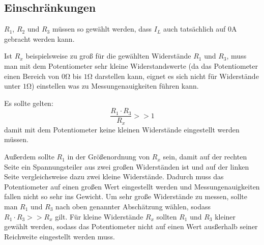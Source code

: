 \documentclass[10pt]{report}
\begin{document}
        \subsection{Einschränkungen}
        $R_1$, $R_2$ und $R_3$ müssen so gewählt werden, dass $I_L$ auch tatsächlich
        auf $0$A gebracht werden kann.

        \vspace{0.5cm}

        Ist $R_x$ beispielsweise zu groß für die gewählten Widerstände $R_1$ und $R_3$, muss
        man mit dem Potentiometer sehr kleine Widerstandswerte (da das Potentiometer einen
		Bereich von $0\si{\ohm}$ bis $1\si{\ohm}$ darstellen kann, eignet es sich nicht für
		Widerstände unter $1\si{\ohm}$) einstellen was zu Messungenauigkeiten führen kann.

        Es sollte gelten:
        \begin{equation*}
            \frac{R_1 \cdot R_3}{R_x} >> 1
        \end{equation*}
        damit mit dem Potentiometer keine kleinen Widerstände eingestellt werden
        müssen.

        Außerdem sollte $R_1$ in der Größenordnung von $R_x$ sein, damit auf der
        rechten Seite ein Spannungsteiler aus zwei großen Widerständen ist und auf
        der linken Seite vergleichsweise dazu zwei kleine Widerstände. Dadurch
        muss das Potentiometer auf einen großen Wert eingestellt werden und
        Messungenauigkeiten fallen nicht so sehr ins Gewicht.
		Um sehr große Widerstände zu messen, sollte man $R_1$ und $R_3$ nach oben genannter
		Abschätzung wählen, sodass $R_1 \cdot R_3 >> R_x$ gilt. Für kleine Widerstände $R_x$
		sollten $R_1$ und $R_3$ kleiner gewählt werden, sodass das Potentiometer nicht auf einen
		Wert ausßerhalb seiner Reichweite eingestellt werden muss.
\end{document}
